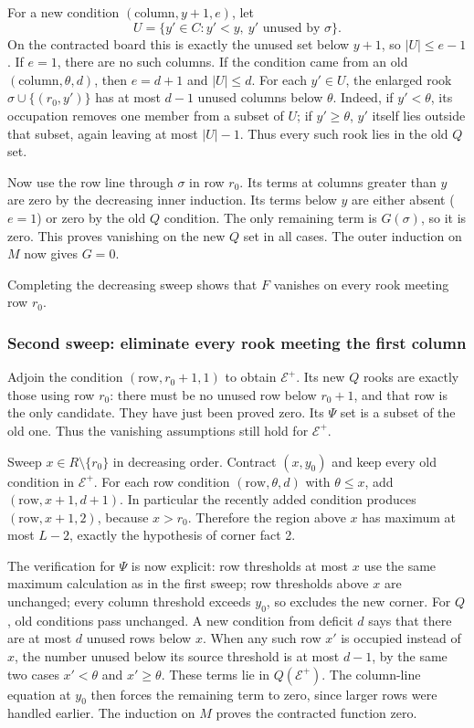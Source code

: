 \documentclass[11pt,a4paper]{article}
\theoremstyle{definition}\newtheorem{definition}[theorem]{Definition}
\theoremstyle{remark}\newtheorem{remark}[theorem]{Remark}
\begin{document}
For a new condition $(\mathrm{column},y+1,e)$, let
\[U=\{y'\in C:y'<y,\ y'\text{ unused by }\sigma\}.
\]
On the contracted board this is exactly the unused set below $y+1$, so $|U|\le e-1$. If $e=1$, there are no such columns. If the condition came from an old $(\mathrm{column},\theta,d)$, then $e=d+1$ and $|U|\le d$. For each $y'\in U$, the enlarged rook $\sigma\cup\{(r_0,y')\}$ has at most $d-1$ unused columns below $\theta$. Indeed, if $y'<\theta$, its occupation removes one member from a subset of $U$; if $y'\ge\theta$, $y'$ itself lies outside that subset, again leaving at most $|U|-1$. Thus every such rook lies in the old $Q$ set.

Now use the row line through $\sigma$ in row $r_0$. Its terms at columns greater than $y$ are zero by the decreasing inner induction. Its terms below $y$ are either absent ($e=1$) or zero by the old $Q$ condition. The only remaining term is $G(\sigma)$, so it is zero. This proves vanishing on the new $Q$ set in all cases. The outer induction on $M$ now gives $G=0$.

Completing the decreasing sweep shows that $F$ vanishes on every rook meeting row $r_0$.

\subsubsection{Second sweep: eliminate every rook meeting the first column}
Adjoin the condition $(\mathrm{row},r_0+1,1)$ to obtain $\mathcal E^+$. Its new $Q$ rooks are exactly those using row $r_0$: there must be no unused row below $r_0+1$, and that row is the only candidate. They have just been proved zero. Its $\Psi$ set is a subset of the old one. Thus the vanishing assumptions still hold for $\mathcal E^+$.

Sweep $x\in R\setminus\{r_0\}$ in decreasing order. Contract $(x,y_0)$ and keep every old condition in $\mathcal E^+$. For each row condition $(\mathrm{row},\theta,d)$ with $\theta\le x$, add $(\mathrm{row},x+1,d+1)$. In particular the recently added condition produces $(\mathrm{row},x+1,2)$, because $x>r_0$. Therefore the region above $x$ has maximum at most $L-2$, exactly the hypothesis of corner fact 2.

The verification for $\Psi$ is now explicit: row thresholds at most $x$ use the same maximum calculation as in the first sweep; row thresholds above $x$ are unchanged; every column threshold exceeds $y_0$, so excludes the new corner. For $Q$, old conditions pass unchanged. A new condition from deficit $d$ says that there are at most $d$ unused rows below $x$. When any such row $x'$ is occupied instead of $x$, the number unused below its source threshold is at most $d-1$, by the same two cases $x'<\theta$ and $x'\ge\theta$. These terms lie in $Q(\mathcal E^+)$. The column-line equation at $y_0$ then forces the remaining term to zero, since larger rows were handled earlier. The induction on $M$ proves the contracted function zero.
\end{document}
